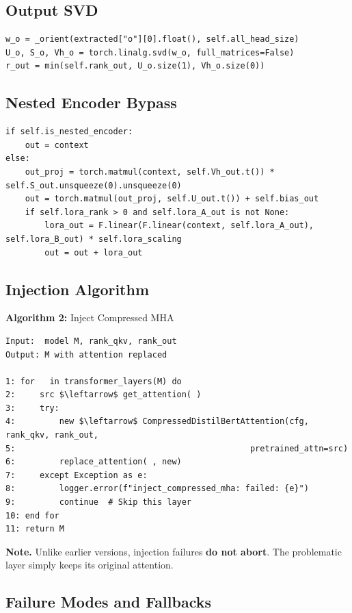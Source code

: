 \subsection{Output SVD}

\begin{lstlisting}
w_o = _orient(extracted["o"][0].float(), self.all_head_size)
U_o, S_o, Vh_o = torch.linalg.svd(w_o, full_matrices=False)
r_out = min(self.rank_out, U_o.size(1), Vh_o.size(0))
\end{lstlisting}

\subsection{Nested Encoder Bypass}

\begin{lstlisting}
if self.is_nested_encoder:
    out = context
else:
    out_proj = torch.matmul(context, self.Vh_out.t()) * self.S_out.unsqueeze(0).unsqueeze(0)
    out = torch.matmul(out_proj, self.U_out.t()) + self.bias_out
    if self.lora_rank > 0 and self.lora_A_out is not None:
        lora_out = F.linear(F.linear(context, self.lora_A_out), self.lora_B_out) * self.lora_scaling
        out = out + lora_out
\end{lstlisting}

\subsection{Injection Algorithm}

\textbf{Algorithm 2:} Inject Compressed MHA
\begin{lstlisting}
Input:  model M, rank_qkv, rank_out
Output: M with attention replaced

1: for   in transformer_layers(M) do
2:     src $\leftarrow$ get_attention( )
3:     try:
4:         new $\leftarrow$ CompressedDistilBertAttention(cfg, rank_qkv, rank_out, 
5:                                                pretrained_attn=src)
6:         replace_attention( , new)
7:     except Exception as e:
8:         logger.error(f"inject_compressed_mha: failed: {e}")
9:         continue  # Skip this layer
10: end for
11: return M
\end{lstlisting}

\textbf{Note.} Unlike earlier versions, injection failures \textbf{do not abort}. 
The problematic layer simply keeps its original attention.

\subsection{Failure Modes and Fallbacks}

